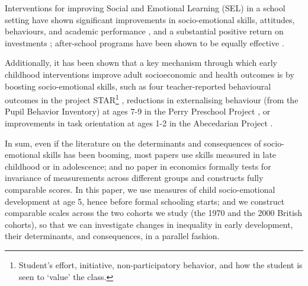 Interventions for improving Social and Emotional Learning (SEL) in a school setting have shown significant improvements in socio-emotional skills, attitudes, behaviours, and academic performance \citep{durlak2011impact}, and a substantial positive return on investments \citep{belfield2015economic}; after-school programs have been shown to be equally effective \citep{durlak2010meta}.

Additionally, it has been shown that a key mechanism through which early childhood interventions improve adult socioeconomic and health outcomes is by boosting socio-emotional skills, such as four teacher-reported behavioural outcomes in the project STAR\footnote{Student's effort, initiative, non-participatory  behavior, and how the student is seen to `value' the class.} \citep{chetty2011does}, reductions in externalising behaviour (from the Pupil Behavior Inventory) at ages 7-9 in the Perry Preschool Project \citep{heckman2013understanding,conti2016effects}, or improvements in task orientation at ages 1-2 in the Abecedarian Project \citep{conti2016effects}.

In sum, even if the literature on the determinants and consequences of socio-emotional skills has been booming, most papers use skills measured in late childhood or in adolescence; and no paper in economics formally tests for invariance of measurements across different groups and constructs fully comparable scores. In this paper, we use measures of child socio-emotional development at age 5, hence before formal schooling starts; and we construct comparable scales across the two cohorts we study (the 1970 and the 2000 British cohorts), so that we can investigate changes in inequality in early development, their determinants, and consequences, in a parallel fashion. 